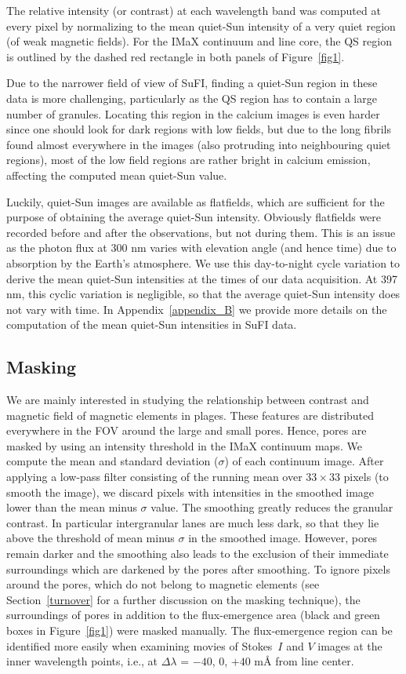 \documentclass[goettingen, gauss, print]{thesis}
\begin{document}
The relative intensity (or contrast) at each wavelength band was computed at every pixel by normalizing to the mean quiet-Sun intensity of a very quiet region (of weak magnetic fields). For the IMaX continuum and line core, the QS region is outlined by the dashed red rectangle in both panels of Figure~\ref{fig1}.

Due to the narrower field of view of SuFI, finding a quiet-Sun region in these data is more challenging, particularly as the QS region has to contain a large number of granules. Locating this region in the calcium images is even harder since one should look for dark regions with low fields, but due to the long fibrils found almost everywhere in the images (also protruding into neighbouring quiet regions), most of the low field regions are rather bright in calcium emission, affecting the computed mean quiet-Sun value. 

Luckily, quiet-Sun images are available as flatfields, which are sufficient for the purpose of obtaining the average quiet-Sun intensity. Obviously flatfields were recorded before and after the observations, but not during them. This is an issue as the photon flux at 300 nm varies with elevation angle (and hence time) due to absorption by the Earth's atmosphere. We use this day-to-night cycle variation to derive the mean quiet-Sun intensities at the times of our data acquisition. At 397 nm, this cyclic variation is negligible, so that the average quiet-Sun intensity does not vary with time. In Appendix~\ref{appendix_B} we provide more details on the computation of the mean quiet-Sun intensities in SuFI data.



\subsection{Masking}
\label{masking}
We are mainly interested in studying the relationship between contrast and magnetic field of magnetic elements in plages. These features are distributed everywhere in the FOV around the large and small pores. Hence, pores are masked by using an intensity threshold in the IMaX continuum maps. We compute the mean and standard deviation ($\sigma$) of each continuum image. After applying a low-pass filter consisting of the running mean over $33\times33$ pixels (to smooth the image), we discard pixels with intensities in the smoothed image lower than the mean minus $\sigma$ value. The smoothing greatly reduces the granular contrast. In particular intergranular lanes are much less dark, so that they lie above the threshold of mean minus $\sigma$ in the smoothed image. However, pores remain darker and the smoothing also leads to the exclusion of their immediate surroundings which are darkened by the pores after smoothing. To ignore pixels around the pores, which do not belong to magnetic elements (see Section~\ref{turnover} for a further discussion on the masking technique), the surroundings of pores in addition to the flux-emergence area (black and green boxes in Figure~\ref{fig1}) were masked manually. The flux-emergence region can be identified more easily when examining movies of Stokes~$I$ and $V$ images at the inner wavelength points, i.e.,  at $\Delta \lambda$ = $-40$, $0$, $+40$ m\AA{} from line center.
\end{document}
